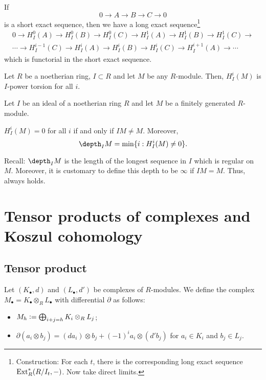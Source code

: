 \documentclass[12pt]{article}
\begin{document}
If 
\begin{equation*} 
	0 \to A \to B \to C \to 0
\end{equation*}
is a short exact sequence, then we have a long exact sequence\footnote{Construction: For each $t$, there is the corresponding long exact sequence $\operatorname{Ext}_{R}^{\ast}(R/I_{t}, -)$. Now take direct limits.}
\begin{align*} 
	0 \to H_{I}^{0}(A) \to H_{I}^{0}(B) \to H_{I}^{0}(C) \to H_{I}^{1}(A) \to H_{I}^{1}(B) \to H_{I}^{1}(C) \to \\
	\cdots \to H_{I}^{i - 1}(C) \to H_{I}^{i}(A) \to H_{I}^{i}(B) \to H_{I}^{i}(C) \to H_{I}^{i + 1}(A) \to \cdots
\end{align*}
which is functorial in the short exact sequence.

\begin{prop}
	Let $R$ be a noetherian ring, $I \subset R$ and let $M$ be any $R$-module. Then, $H_{I}^{i}(M)$ is $I$-power torsion for all $i$.
\end{prop}

\begin{thm}
	Let $I$ be an ideal of a noetherian ring $R$ and let $M$ be a finitely generated $R$-module. 

	$H_{I}^{i}(M) = 0$ for all $i$ if and only if $IM \neq M$. Moreover,
	\begin{equation} \label{eq:002}
		\depth_{I} M = \min\{i : H_{I}^{i}(M) \neq 0\}.
	\end{equation}
\end{thm}
Recall: $\depth_{I} M$ is the length of the longest sequence in $I$ which is regular on $M$. Moreover, it is customary to define this depth to be $\infty$ if $IM = M$. Thus,  always holds.

\section{Tensor products of complexes and Koszul cohomology}

\subsection{Tensor product}

Let $(K_{\bullet}, d)$ and $(L_{\bullet}, d')$ be complexes of $R$-modules. We define the complex $M_{\bullet} = K_{\bullet} \otimes_{R} L_{\bullet}$ with differential $\partial$ as follows:
\begin{itemize}
	\item $M_{h} \vcentcolon= \bigoplus_{i + j = h} K_{i} \otimes_{R} L_{j}$;
	\item $\partial(a_{i} \otimes b_{j}) = (d a_{i}) \otimes b_{j} + (-1)^{i} a_{i} \otimes (d' b_{j})$ for $a_{i} \in K_{i}$ and $b_{j} \in L_{j}$.
\end{itemize}
\end{document}
